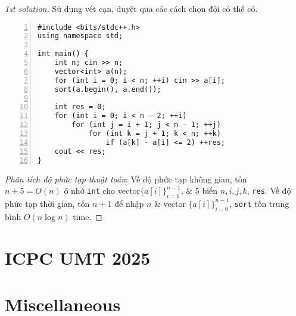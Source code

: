\documentclass{article}
\begin{document}
\begin{proof}[1st solution]
    Sử dụng vét cạn, duyệt qua các cách chọn đội có thể có.
    \begin{Verbatim}[numbers=left,xleftmargin=5mm]
#include <bits/stdc++.h>
using namespace std;

int main() {
    int n; cin >> n;
    vector<int> a(n);
    for (int i = 0; i < n; ++i) cin >> a[i];
    sort(a.begin(), a.end());
    
    int res = 0;
    for (int i = 0; i < n - 2; ++i)
        for (int j = i + 1; j < n - 1; ++j)
            for (int k = j + 1; k < n; ++k)
                if (a[k] - a[i] <= 2) ++res;
    cout << res;
}
    \end{Verbatim}
     {\it Phân tích độ phức tạp thuật toán}: Về độ phức tạp không gian, tốn $n + 5 = O(n)$ ô nhớ {\tt int} cho vector$\{a[i]\}_{i=0}^{n-1}$, \& 5 biến $n,i,j,k$, {\tt res}. Về độ phức tạp thời gian, tốn $n + 1$ để nhập $n$ \& vector $\{a[i]\}_{i=0}^{n-1}$, {\tt sort} tốn trung bình $O(n\log n)$ time.
\end{proof}


 \section{ICPC UMT 2025}
 
 


\section{Miscellaneous}


\printbibliography[heading=bibintoc]
    
\end{document}
